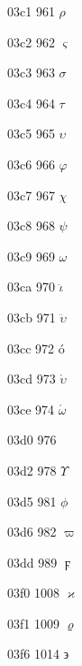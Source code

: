 \documentclass[11pt]{article}
\begin{document}
03c1 961 \ensuremath{\rho}

03c2 962 \ensuremath{\varsigma}

03c3 963 \ensuremath{\sigma}

03c4 964 \ensuremath{\tau}

03c5 965 \ensuremath{\upsilon}

03c6 966 \ensuremath{\varphi}

03c7 967 \ensuremath{\chi}

03c8 968 \ensuremath{\psi}

03c9 969 \ensuremath{\omega}

03ca 970 \ensuremath{\ddot{\iota}}

03cb 971 \ensuremath{\ddot{\upsilon}}

03cc 972 \'o

03cd 973 \ensuremath{\acute{\upsilon}}

03ce 974 \ensuremath{\acute{\omega}}

03d0 976 


03d2 978 \ensuremath{\Upsilon}

03d5 981 \ensuremath{\phi}

03d6 982 \ensuremath{\varpi}



03dd 989 \ensuremath{\digamma}



03f0 1008 \ensuremath{\varkappa}

03f1 1009 \ensuremath{\varrho}



03f6 1014 \ensuremath{\backepsilon}
\end{document}
